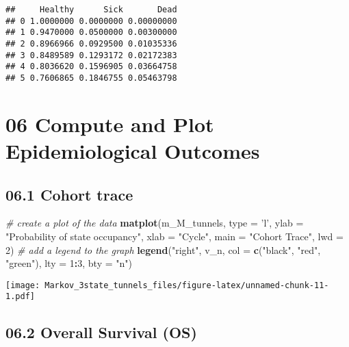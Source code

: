 \documentclass[
]{article}
\newenvironment{Shaded}{\begin{snugshade}}{\end{snugshade}}
\newcommand{\CommentTok}[1]{\textcolor[rgb]{0.56,0.35,0.01}{\textit{#1}}}
\newcommand{\DataTypeTok}[1]{\textcolor[rgb]{0.13,0.29,0.53}{#1}}
\newcommand{\DecValTok}[1]{\textcolor[rgb]{0.00,0.00,0.81}{#1}}
\newcommand{\KeywordTok}[1]{\textcolor[rgb]{0.13,0.29,0.53}{\textbf{#1}}}
\newcommand{\NormalTok}[1]{#1}
\newcommand{\OperatorTok}[1]{\textcolor[rgb]{0.81,0.36,0.00}{\textbf{#1}}}
\newcommand{\StringTok}[1]{\textcolor[rgb]{0.31,0.60,0.02}{#1}}
\begin{document}
\begin{verbatim}
##     Healthy      Sick       Dead
## 0 1.0000000 0.0000000 0.00000000
## 1 0.9470000 0.0500000 0.00300000
## 2 0.8966966 0.0929500 0.01035336
## 3 0.8489589 0.1293172 0.02172383
## 4 0.8036620 0.1596905 0.03664758
## 5 0.7606865 0.1846755 0.05463798
\end{verbatim}

\hypertarget{compute-and-plot-epidemiological-outcomes}{%
\section{06 Compute and Plot Epidemiological
Outcomes}\label{compute-and-plot-epidemiological-outcomes}}

\hypertarget{cohort-trace-1}{%
\subsection{06.1 Cohort trace}\label{cohort-trace-1}}

\begin{Shaded}
\begin{Highlighting}[]
\CommentTok{# create a plot of the data}
\KeywordTok{matplot}\NormalTok{(m_M_tunnels, }\DataTypeTok{type =} \StringTok{'l'}\NormalTok{, }
        \DataTypeTok{ylab =} \StringTok{"Probability of state occupancy"}\NormalTok{,}
        \DataTypeTok{xlab =} \StringTok{"Cycle"}\NormalTok{,}
        \DataTypeTok{main =} \StringTok{"Cohort Trace"}\NormalTok{, }\DataTypeTok{lwd =} \DecValTok{2}\NormalTok{)              }
\CommentTok{# add a legend to the graph}
\KeywordTok{legend}\NormalTok{(}\StringTok{"right"}\NormalTok{, v_n, }\DataTypeTok{col =} \KeywordTok{c}\NormalTok{(}\StringTok{"black"}\NormalTok{, }\StringTok{"red"}\NormalTok{, }\StringTok{"green"}\NormalTok{), }\DataTypeTok{lty =} \DecValTok{1}\OperatorTok{:}\DecValTok{3}\NormalTok{, }\DataTypeTok{bty =} \StringTok{"n"}\NormalTok{)  }
\end{Highlighting}
\end{Shaded}

\texttt{[image: Markov\_3state\_tunnels\_files/figure-latex/unnamed-chunk-11-1.pdf]}

\hypertarget{overall-survival-os}{%
\subsection{06.2 Overall Survival (OS)}\label{overall-survival-os}}
\end{document}
